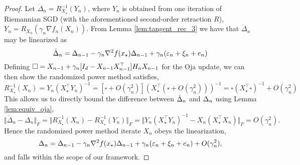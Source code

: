 \begin{proof}
 Let $\dot \Delta_n=R_{X_\star}^{-1}(Y_{n})$, where $Y_n$ is obtained from one iteration of Riemannian SGD (with the aforementioned second-order retraction $R$), $Y_n=R_{X_n}(\gamma_n \nabla f_n(X_n))$. From Lemma \ref{lem:tangent_rec_3} we have that $\dot \Delta_n$ may be linearized as
\[
 \dot{\Delta}_{n}=\Delta_{n-1} -\gamma_n \nabla^2 f(x_\star) \Delta_{n-1}+ \gamma_n (\varepsilon_n+\xi_{n}+e_{n})
\]
Defining $\square= X_{n-1}+\gamma_n [I_d -X_{n-1}X_{n-1}^\top]  H_n X_{n-1}$ for the Oja update, we can then show the randomized power method satisfies,
\[
R^{-1}_{X_\star}(X_n)= Y_n(X_\star^\top Y_n)^{-1}=[\square +O(\gamma_n^2)](X_\star^\top (\square +O(\gamma_n^2)))^{-1}=\square (X_\star^\top \square )^{-1}+O(\gamma_n^2)
\]
This allows us to directly bound the difference between $\dot{\Delta}_{n}$ and $\Delta_n$ using Lemma \ref{lem:equiv_oja},
\[
\Vert \dot \Delta_n- \Delta_n \Vert_F=
\Vert R^{-1}_{X_\star}(X_n)-R^{-1}_{X_\star}(Y_n) \Vert_F =
\Vert Y_n(X_\star^\top Y_n)^{-1}-X_n(X_\star^\top X_n) \Vert_F = O(\gamma_n^2).
\]
Hence the randomized power method iterate $X_n$ obeys the linearization,
\[
\Delta_n=\Delta_{n-1} -\gamma_n \nabla^2 f(x_\star) \Delta_{n-1}+ \gamma_n (\varepsilon_n+\xi_{n}+e_{n}) +O(\gamma_n^2),
\]
and falls within the scope of our framework.
\end{proof}

